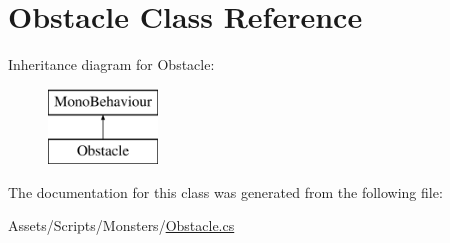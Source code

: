 \hypertarget{class_obstacle}{}\section{Obstacle Class Reference}
\label{class_obstacle}
Inheritance diagram for Obstacle\+:\begin{figure}[H]
\begin{center}
\leavevmode
\includegraphics[height=2.000000cm]{class_obstacle}
\end{center}
\end{figure}


The documentation for this class was generated from the following file\+:\begin{DoxyCompactItemize}
\item 
Assets/\+Scripts/\+Monsters/\mbox{\hyperlink{_obstacle_8cs}{Obstacle.\+cs}}\end{DoxyCompactItemize}
